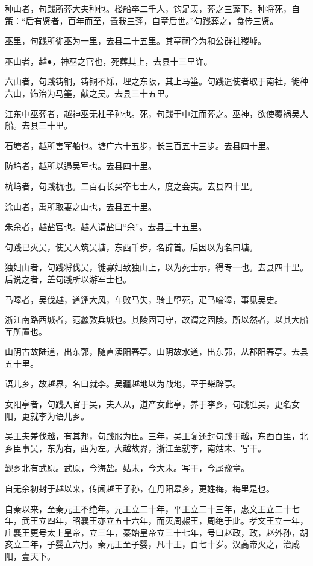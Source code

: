 \documentclass[12pt,UTF8]{ctexbook}
\begin{document}
种山者，句践所葬大夫种也。楼船卒二千人，钧足羡，葬之三蓬下。种将死，自策：“后有贤者，百年而至，置我三蓬，自章后世。”句践葬之，食传三贤。

巫里，句践所徙巫为一里，去县二十五里。其亭祠今为和公群社稷墟。

巫山者，越●，神巫之官也，死葬其上，去县十三里许。

六山者，句践铸铜，铸铜不烁，埋之东阪，其上马箠。句践遣使者取于南社，徙种六山，饰治为马箠，献之吴。去县三十五里。

江东中巫葬者，越神巫无杜子孙也。死，句践于中江而葬之。巫神，欲使覆祸吴人船。去县三十里。

石塘者，越所害军船也。塘广六十五步，长三百五十三步。去县四十里。

防坞者，越所以遏吴军也。去县四十里。

杭坞者，句践杭也。二百石长买卒七士人，度之会夷。去县四十里。

涂山者，禹所取妻之山也，去县五十里。

朱余者，越盐官也。越人谓盐曰“余”。去县三十五里。

句践已灭吴，使吴人筑吴塘，东西千步，名辟首。后因以为名曰塘。

独妇山者，句践将伐吴，徙寡妇致独山上，以为死士示，得专一也。去县四十里。后说之者，盖句践所以游军士也。

马嗥者，吴伐越，道逢大风，车败马失，骑士堕死，疋马啼嗥，事见吴史。

浙江南路西城者，范蠡敦兵城也。其陵固可守，故谓之固陵。所以然者，以其大船军所置也。

山阴古故陆道，出东郭，随直渎阳春亭。山阴故水道，出东郭，从郡阳春亭。去县五十里。

语儿乡，故越界，名曰就李。吴疆越地以为战地，至于柴辟亭。

女阳亭者，句践入官于吴，夫人从，道产女此亭，养于李乡，句践胜吴，更名女阳，更就李为语儿乡。

吴王夫差伐越，有其邦，句践服为臣。三年，吴王复还封句践于越，东西百里，北乡臣事吴，东为右，西为左。大越故界，浙江至就李，南姑末、写干。

觐乡北有武原。武原，今海盐。姑末，今大末。写干，今属豫章。

自无余初封于越以来，传闻越王子孙，在丹阳皋乡，更姓梅，梅里是也。

自秦以来，至秦元王不绝年。元王立二十年，平王立二十三年，惠文王立二十七年，武王立四年，昭襄王亦立五十六年，而灭周赧王，周绝于此。孝文王立一年，庄襄王更号太上皇帝，立三年，秦始皇帝立三十七年，号曰赵政，政，赵外孙，胡亥立二年，子婴立六月。秦元王至子婴，凡十王，百七十岁。汉高帝灭之，治咸阳，壹天下。
\end{document}
